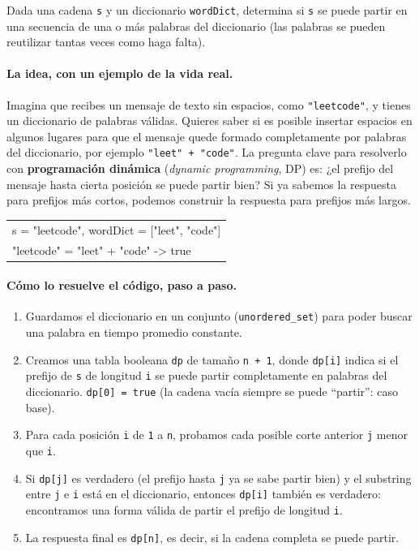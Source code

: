 
Dada una cadena \texttt{s} y un diccionario \texttt{wordDict}, determina si
\texttt{s} se puede partir en una secuencia de una o más palabras del
diccionario (las palabras se pueden reutilizar tantas veces como haga
falta).

\paragraph{La idea, con un ejemplo de la vida real.} Imagina que recibes un
mensaje de texto sin espacios, como \texttt{"leetcode"}, y tienes un
diccionario de palabras válidas. Quieres saber si es posible insertar
espacios en algunos lugares para que el mensaje quede formado completamente
por palabras del diccionario, por ejemplo \texttt{"leet" + "code"}. La
pregunta clave para resolverlo con \textbf{programación dinámica}
(\emph{dynamic programming}, DP) es: ¿el prefijo del mensaje hasta cierta
posición se puede partir bien? Si ya sabemos la respuesta para prefijos más
cortos, podemos construir la respuesta para prefijos más largos.

\begin{center}
\ttfamily
\begin{tabular}{l}
s = "leetcode", wordDict = ["leet", "code"]\\
"leetcode" = "leet" + "code" -> true\\
\end{tabular}
\end{center}

\paragraph{Cómo lo resuelve el código, paso a paso.}
\begin{enumerate}
  \item Guardamos el diccionario en un conjunto (\texttt{unordered\_set})
        para poder buscar una palabra en tiempo promedio constante.
  \item Creamos una tabla booleana \texttt{dp} de tamaño \texttt{n + 1},
        donde \texttt{dp[i]} indica si el prefijo de \texttt{s} de longitud
        \texttt{i} se puede partir completamente en palabras del
        diccionario. \texttt{dp[0] = true} (la cadena vacía siempre se puede
        ``partir'': caso base).
  \item Para cada posición \texttt{i} de \texttt{1} a \texttt{n}, probamos
        cada posible corte anterior \texttt{j} menor que \texttt{i}.
  \item Si \texttt{dp[j]} es verdadero (el prefijo hasta \texttt{j} ya se
        sabe partir bien) y el substring entre \texttt{j} e \texttt{i} está
        en el diccionario, entonces \texttt{dp[i]} también es verdadero:
        encontramos una forma válida de partir el prefijo de longitud
        \texttt{i}.
  \item La respuesta final es \texttt{dp[n]}, es decir, si la cadena
        completa se puede partir.
\end{enumerate}

